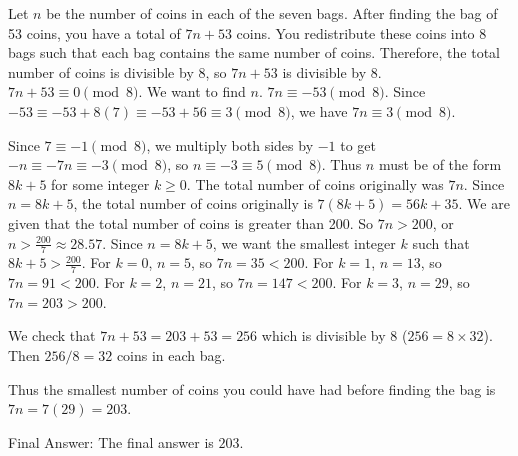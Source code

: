 \begin{tcolorbox}[breakable, colframe=red!70, colback=red!10, title=Incorrect Response Reaching Correct Final Answer]
Let $n$ be the number of coins in each of the seven bags. After finding the bag of 53 coins, you have a total of $7n + 53$ coins.
You redistribute these coins into 8 bags such that each bag contains the same number of coins.
Therefore, the total number of coins is divisible by 8, so $7n+53$ is divisible by 8.
$7n + 53 \equiv 0 \pmod{8}$.
We want to find $n$.
$7n \equiv -53 \pmod{8}$.
Since $-53 \equiv -53 + 8(7) \equiv -53 + 56 \equiv 3 \pmod{8}$, we have
$7n \equiv 3 \pmod{8}$.

Since $7 \equiv -1 \pmod{8}$, we multiply both sides by $-1$ to get
$-n \equiv -7n \equiv -3 \pmod{8}$, so $n \equiv -3 \equiv 5 \pmod{8}$.
Thus $n$ must be of the form $8k + 5$ for some integer $k \geq 0$.
The total number of coins originally was $7n$. Since $n=8k+5$, the total number of coins originally is
$7(8k+5) = 56k + 35$.
We are given that the total number of coins is greater than 200.
So $7n > 200$, or $n > \frac{200}{7} \approx 28.57$.
Since $n = 8k + 5$, we want the smallest integer $k$ such that $8k + 5 > \frac{200}{7}$.
For $k=0$, $n=5$, so $7n=35<200$.
For $k=1$, $n=13$, so $7n=91<200$.
For $k=2$, $n=21$, so $7n=147<200$.
For $k=3$, $n=29$, so $7n=203>200$.

We check that $7n + 53 = 203 + 53 = 256$ which is divisible by $8$ ($256 = 8 \times 32$).
Then $256/8 = 32$ coins in each bag.

Thus the smallest number of coins you could have had before finding the bag is $7n = 7(29) = 203$.

Final Answer: The final answer is $\boxed{203}$.
\end{tcolorbox}
